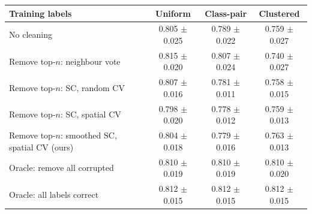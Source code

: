 \begin{tabular}{l ccc}
\toprule
Training labels & Uniform & Class-pair & Clustered \\
\midrule
No cleaning & 0.805 $\pm$ 0.025 & 0.789 $\pm$ 0.022 & 0.759 $\pm$ 0.027 \\
\midrule
Remove top-$n$: neighbour vote & 0.815 $\pm$ 0.020 & 0.807 $\pm$ 0.024 & 0.740 $\pm$ 0.027 \\
Remove top-$n$: SC, random CV & 0.807 $\pm$ 0.016 & 0.781 $\pm$ 0.011 & 0.758 $\pm$ 0.015 \\
Remove top-$n$: SC, spatial CV & 0.798 $\pm$ 0.020 & 0.778 $\pm$ 0.012 & 0.759 $\pm$ 0.013 \\
Remove top-$n$: smoothed SC, spatial CV (ours) & 0.804 $\pm$ 0.018 & 0.779 $\pm$ 0.016 & 0.763 $\pm$ 0.013 \\
\midrule
Oracle: remove all corrupted & 0.810 $\pm$ 0.019 & 0.810 $\pm$ 0.019 & 0.810 $\pm$ 0.020 \\
Oracle: all labels correct & 0.812 $\pm$ 0.015 & 0.812 $\pm$ 0.015 & 0.812 $\pm$ 0.015 \\
\bottomrule
\end{tabular}